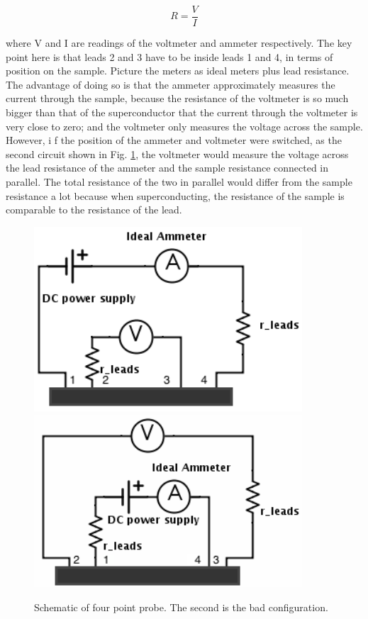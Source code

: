 \documentclass[prb,preprint]{revtex4-1}
\begin{document}
\begin{equation}
R=\frac{V}{I}
\label{ohm}
\end{equation}

where V and I are readings of the voltmeter and ammeter respectively. The key point here is that leads 2 and 3 have to be inside leads 1 and 4, in terms of position on the sample. Picture the meters as ideal meters plus lead resistance. The advantage of doing so is that the ammeter approximately measures the current through the sample, because the resistance of the voltmeter is so much bigger than that of the superconductor that the current through the voltmeter is very close to zero; and the voltmeter only measures the voltage across the sample. However, i f the position of the ammeter and voltmeter were switched, as the second circuit shown in Fig. \ref{fpp}, the voltmeter would measure the voltage across the lead resistance of the ammeter and the sample resistance connected in parallel. The total resistance of the two in parallel would differ from the sample resistance a lot because when superconducting, the resistance of the sample is comparable to the resistance of the lead. \\

\begin{figure}[h]
\centering
\includegraphics[width=10cm]{fourpointprobe2.png}
\includegraphics[width=10cm]{fourpointprobe3.png}
\caption{Schematic of four point probe. The second is the bad configuration.}
\label{fpp}
\end{figure}
\end{document}
